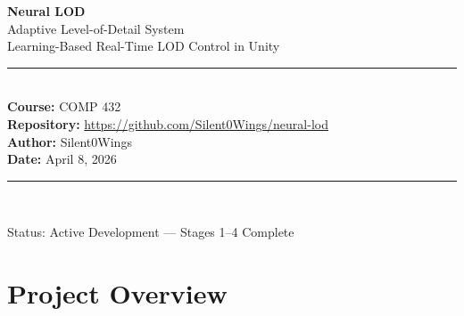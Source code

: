 \documentclass[12pt, a4paper]{article}
\begin{document}
\begin{titlepage}
  \centering
  \vspace*{2cm}
  {\Huge\bfseries\color{accentblue} Neural LOD}\\[0.4cm]
  {\LARGE Adaptive Level-of-Detail System}\\[0.3cm]
  {\large\color{codegray} Learning-Based Real-Time LOD Control in Unity}\\[2cm]
  \rule{0.8\textwidth}{0.5pt}\\[1cm]
  {\large\bfseries Course:} COMP 432\\[0.3cm]
  {\large\bfseries Repository:} \url{https://github.com/Silent0Wings/neural-lod}\\[0.3cm]
  {\large\bfseries Author:} Silent0Wings\\[0.3cm]
  {\large\bfseries Date:} April 8, 2026\\[1cm]
  \rule{0.8\textwidth}{0.5pt}\\[1cm]
  \begin{abstract}
    \noindent
    This report documents the full design, implementation, and evaluation of
    \textbf{Neural LOD} — a machine-learning system that trains neural networks
    to predict optimal Level-of-Detail (LOD) thresholds for real-time rendering
    inside a Unity scene. The system progresses through four training stages,
    evolving from a scalar global bias predictor (Stage~1) to a per-object
    threshold vector predictor (Stage~3) to a REINFORCE reinforcement-learning
    policy (Stage~4). Data are collected by automated Unity playback, labelled
    with a reactive oracle, and fed to PyTorch MLP models exported as ONNX for
    Unity inference via \texttt{com.unity.ai.inference}. The best v4 model
    achieves \textbf{MAE\,=\,0.039} bias units and reduces over-budget frames
    from 55.2\,\% (fixed baseline) to \textbf{47.5\,\%} at runtime. Stability
    filters (EMA + dwell timer) eliminate previously observed LOD jitter.
  \end{abstract}
  \vfill
  {\small Status: Active Development — Stages 1–4 Complete}
\end{titlepage}

\tableofcontents
\newpage

\section{Project Overview}
\label{sec:overview}
\end{document}
